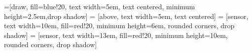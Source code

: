 \newcommand{\mx}[1]{\mathbf{\bm{#1}}} %
\newcommand{\vc}[1]{\mathbf{\bm{#1}}} %



=[draw, fill=blue!20, text width=5em, 
    text centered, minimum height=2.5em,drop shadow]
 = [above, text width=5em, text centered]
 = [sensor, text width=10em, fill=red!20, 
    minimum height=6em, rounded corners, drop shadow]
 = [sensor, text width=13em, fill=red!20, 
    minimum height=10em, rounded corners, drop shadow]

\def\blockdist{1.5}
\def\edgedist{2.5}


